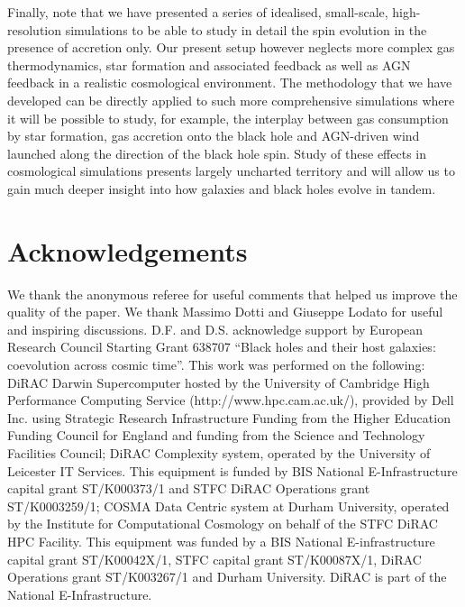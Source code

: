 \documentclass[a4paper,fleqn,usenatbib]{mnras}
\begin{document}
Finally, note that we have presented a series of idealised, small-scale, high-resolution simulations to be able to study in detail the spin evolution in the presence of accretion only. Our present setup however neglects more complex gas thermodynamics, star formation and associated feedback as well as AGN feedback in a realistic cosmological environment.
The methodology that we have developed can be directly applied to such more comprehensive simulations where it will be possible to study, for example, the interplay between gas consumption by star formation, gas accretion onto the black hole and AGN-driven wind launched along the direction of the black hole spin.
Study of these effects in cosmological simulations presents largely uncharted territory and will allow us to gain much deeper insight into how galaxies and black holes evolve in tandem.


\section*{Acknowledgements}

We thank the anonymous referee for useful comments that helped us improve the quality of the paper.
We thank Massimo Dotti and Giuseppe Lodato for useful and inspiring discussions.
D.F. and D.S. acknowledge support by European Research Council Starting Grant 638707 ``Black holes and their host galaxies: coevolution across cosmic time''.
This  work  was  performed  on  the  following:  DiRAC  Darwin  Supercomputer  hosted  by  the  University  of  Cambridge  High  Performance  Computing  Service  (http://www.hpc.cam.ac.uk/),  provided  by  Dell  Inc. using  Strategic  Research  Infrastructure  Funding  from  the Higher Education Funding Council for England and funding from the Science and Technology Facilities Council; DiRAC Complexity  system,  operated  by  the  University  of  Leicester IT Services.
This equipment is funded by BIS National E-Infrastructure  capital  grant  ST/K000373/1  and  STFC DiRAC  Operations  grant  ST/K0003259/1;  COSMA  Data Centric system at Durham University, operated by the Institute for Computational Cosmology on behalf of the STFC DiRAC  HPC  Facility.
This  equipment  was  funded  by  a BIS National E-infrastructure capital grant ST/K00042X/1, STFC  capital  grant  ST/K00087X/1,  DiRAC  Operations grant  ST/K003267/1  and  Durham  University.
DiRAC  is part of the National E-Infrastructure.
\end{document}
